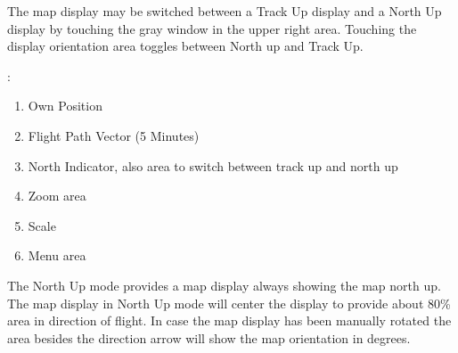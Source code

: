 \documentclass[letterpaper,10pt,english]{sphinxmanual}
\begin{document}
\sphinxAtStartPar
{}

\sphinxAtStartPar
The  map display may be switched between a Track Up
display and a North Up display by touching the gray window in the upper right
area.  Touching the display orientation area toggles between North up and Track
Up.

\begin{figure}[htbp]
\centering

\noindent{}
\end{figure}

\sphinxAtStartPar
{}:
\begin{enumerate}
%
\item {} 
\sphinxAtStartPar
Own Position

\item {} 
\sphinxAtStartPar
Flight Path Vector (5 Minutes)

\item {} 
\sphinxAtStartPar
North Indicator, also area to switch between track up and north up

\item {} 
\sphinxAtStartPar
Zoom area

\item {} 
\sphinxAtStartPar
Scale

\item {} 
\sphinxAtStartPar
Menu area

\end{enumerate}

\sphinxAtStartPar
The North Up mode provides a map display always showing the map north up.  The
 map display in North Up mode will center the
display to provide about 80\% area in direction of flight.  In case the map
display has been manually rotated the area besides the direction arrow will show
the map orientation in degrees.



\renewcommand{\indexname}{Index}
\footnotesize\raggedright\printindex
\end{document}
